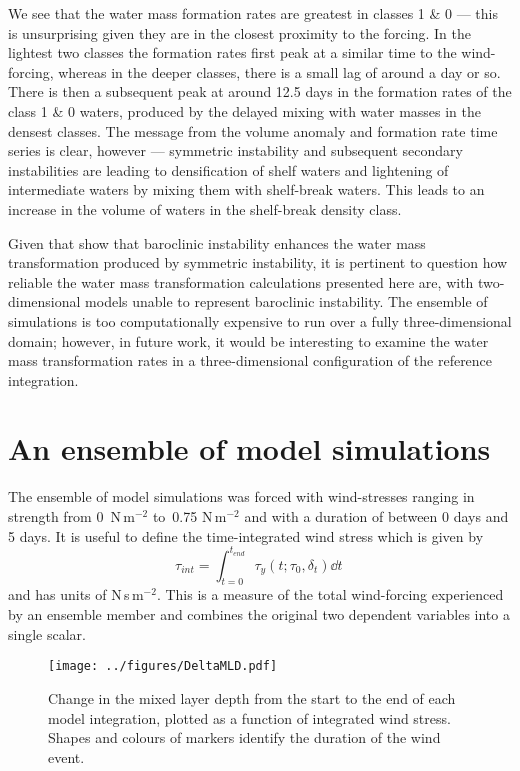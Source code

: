We see that the water mass formation rates are greatest in classes 1 \& 0 --- this is unsurprising given they are in the closest proximity to the forcing. In the lightest two classes the formation rates first peak at a similar time to the wind-forcing, whereas in the deeper classes, there is a small lag of around a day or so. There is then a subsequent peak at around 12.5 days in the formation rates of the class 1 \& 0 waters, produced by the delayed mixing with water masses in the densest classes. The message from the volume anomaly and formation rate time series is clear, however --- symmetric instability and subsequent secondary instabilities are leading to densification of shelf waters and lightening of intermediate waters by mixing them with shelf-break waters. This leads to an increase in the volume of waters in the shelf-break density class.

Given that \citet{Spall2016} show that baroclinic instability enhances the water mass transformation produced by symmetric instability, it is pertinent to question how reliable the water mass transformation calculations presented here are, with two-dimensional models unable to represent baroclinic instability. The ensemble of simulations is too computationally expensive to run over a fully three-dimensional domain; however, in future work, it would be interesting to examine the water mass transformation rates in a three-dimensional configuration of the reference integration.

\section{An ensemble of model simulations}
\label{sec:IrmEns}
The ensemble of model simulations was forced with wind-stresses ranging in strength from 0~N\,m$^{-2}$ to~0.75 N\,m$^{-2}$ and with a duration of between 0 days and 5 days. It is useful to define the time-integrated wind stress which is given by
\begin{equation}
    \tau_{int} = \int^{t_{end}}_{t=0} \tau_y(t; \tau_0, \delta_t)\dd t \,
\end{equation}
and has units of N\,s\,m$^{-2}$. This is a measure of the total wind-forcing experienced by an ensemble member and combines the original two dependent variables into a single scalar.

\begin{figure}[t]
    \centering
    \texttt{[image: ../figures/DeltaMLD.pdf]}
    \caption{Change in the mixed layer depth from the start to the end of each model integration, plotted as a function of integrated wind stress. Shapes and colours of markers identify the duration of the wind event.}
    \label{fig:DeltaMLD}
\end{figure}

